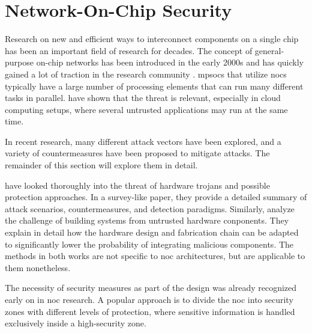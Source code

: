 \section{Network-On-Chip Security}\label{sec:networkonchipsecurity}
Research on new and efficient ways to interconnect components on a single chip has been an important field of research for decades. The concept of
general-purpose on-chip networks has been introduced in the early 2000s
\cites{dally01routepacketsnotwires}{kumar02networkonchip}{benini02nocparadigm} and has quickly gained a lot of traction in the research community
\cite[e.g.][]{ivanov05nocintroduction}. 
\Glspl{mpsoc} that utilize \glspl{noc} typically have a large number of processing elements that can run many different
tasks in parallel. \citeauthor{ancajas14fortnocs} have shown that the threat is relevant, especially in cloud computing setups, where several
untrusted applications may run at the same time. \cite{ancajas14fortnocs} %

In recent research, many different attack vectors have been explored, and a variety of countermeasures have been proposed to mitigate
attacks. The remainder of this section will explore them in detail.

\citeauthor{bhunia14hardwaretrojans} \cite{bhunia14hardwaretrojans} have looked thoroughly into the threat of hardware trojans and possible protection
approaches. In a survey-like paper, they provide a detailed summary of attack scenarios, countermeasures, and detection paradigms. Similarly,
\citeauthor{sethumadhavan15trustworthyhardware} \cite{sethumadhavan15trustworthyhardware} analyze the challenge of building systems from untrusted
hardware conponents. They explain in detail how the hardware design and fabrication chain can be adapted to significantly lower the probability of
integrating malicious components. The methods in both works are not specific to \gls{noc} architectures, but are applicable to them nonetheless.

The necessity of security measures as part of the design was already recognized early on in \gls{noc} research. A popular approach is to
divide the \gls{noc} into security zones with different levels of protection, where sensitive information is handled exclusively inside a
high-security zone. \cites(e.g.)(){gebotys03securityframework}{fernandes16nocrouting}{kapoor13nocauthenc}

